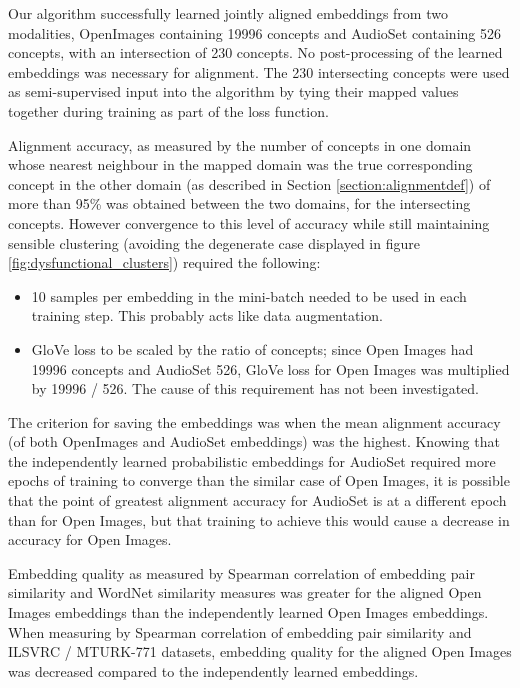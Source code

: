 Our algorithm successfully learned jointly aligned embeddings from two modalities, OpenImages containing 19996 concepts and AudioSet containing 526 concepts, with an intersection of 230 concepts. No post-processing of the learned embeddings was necessary for alignment. The 230 intersecting concepts were used as semi-supervised input into the algorithm by tying their mapped values together during training as part of the loss function. 

Alignment accuracy, as measured by the number of concepts in one domain whose nearest neighbour in the mapped domain was the true corresponding concept in the other domain (as described in Section \ref{section:alignmentdef})  of more than 95\% was obtained between the two domains, for the intersecting concepts. However convergence to this level of accuracy while still maintaining sensible clustering (avoiding the degenerate case displayed in figure \ref{fig:dysfunctional_clusters}) required the following:

    \begin{itemize}
        \item 10 samples per embedding in the mini-batch needed to be used in each training step. This probably acts like data augmentation. 
        \item GloVe loss to be scaled by the ratio of concepts; since Open Images had 19996 concepts and AudioSet 526, GloVe loss for Open Images was multiplied by 19996 / 526. The cause of this requirement has not been investigated. 
    \end{itemize}
    
The criterion for saving the embeddings was when the mean alignment accuracy (of both OpenImages and AudioSet embeddings) was the highest. Knowing that the independently learned probabilistic embeddings for AudioSet required more epochs of training to converge than the similar case of Open Images, it is possible that the point of greatest alignment accuracy for AudioSet is at a different epoch than for Open Images, but that training to achieve this would cause a decrease in accuracy for Open Images. 

Embedding quality as measured by Spearman correlation of embedding pair similarity and WordNet similarity measures was greater for the aligned Open Images embeddings than the independently learned Open Images embeddings. When measuring by Spearman correlation of embedding pair similarity and ILSVRC / MTURK-771 datasets, embedding quality for the aligned Open Images was decreased compared to the independently learned embeddings.     

